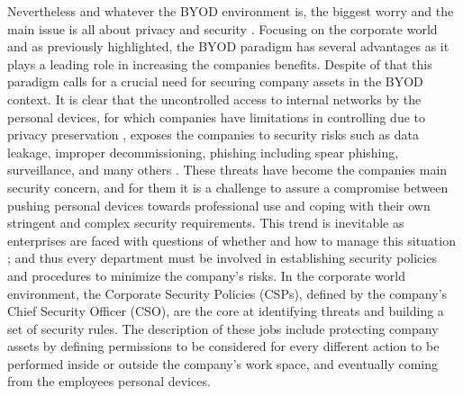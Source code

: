 \documentclass[a4paper,10pt,twocolumn,preprint,3p]{elsarticle}
\begin{document}
Nevertheless and whatever the BYOD environment is, the biggest worry and the main issue is all about privacy and security \cite{miller2012byod}.%
Focusing on the corporate world and as previously highlighted, %
 the BYOD paradigm has several advantages
as it plays a leading role in increasing the
companies benefits.  Despite of that this
paradigm calls for a crucial need for securing company assets in the BYOD context. It is
clear that the uncontrolled access to internal networks by the
personal devices, for which companies have limitations in
controlling due to privacy preservation \cite{miller2012byod}, exposes the companies to security risks such as data
leakage, improper decommissioning, phishing including spear phishing, surveillance, and many
others \cite{lennon2012changing}. These threats have become the
companies main security concern, and for them it is a challenge to
assure a compromise between pushing personal devices towards
professional use and coping with their own stringent and complex
security requirements. This trend is inevitable as enterprises are
faced with questions of whether and how to manage this situation \cite{thomson2012byod}; and
thus every department must be involved in establishing security
policies and procedures to minimize the company's risks. In the
corporate world environment, the Corporate Security Policies (CSPs),
defined by the company's Chief Security Officer (CSO), are the core at
identifying threats and building a set of security rules. The description of these jobs include protecting
company assets by defining permissions to be considered for every
different action to be performed inside or outside the company's work
space, and eventually coming from the employees personal devices.
\end{document}
